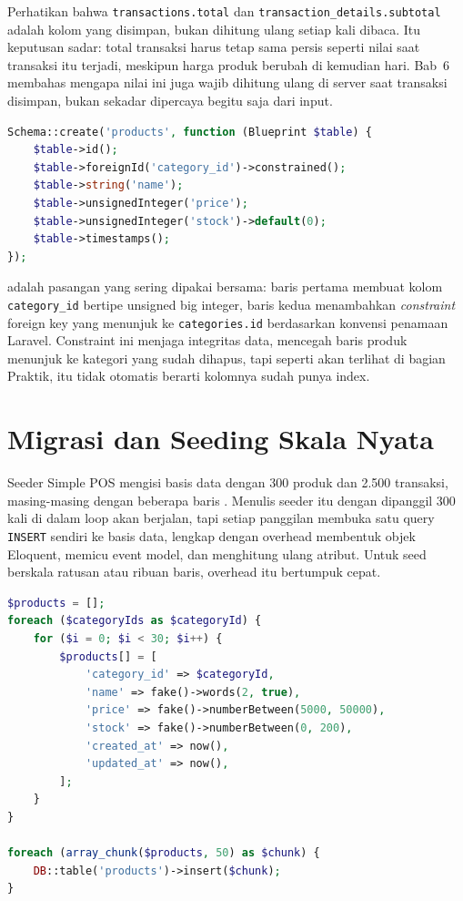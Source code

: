Perhatikan bahwa \texttt{transactions.total} dan
\texttt{transaction\_details.subtotal} adalah kolom yang disimpan, bukan
dihitung ulang setiap kali dibaca. Itu keputusan sadar: total transaksi
harus tetap sama persis seperti nilai saat transaksi itu terjadi, meskipun
harga produk berubah di kemudian hari. Bab~6 membahas mengapa nilai ini
juga wajib dihitung ulang di server saat transaksi disimpan, bukan
sekadar dipercaya begitu saja dari input.

\begin{lstlisting}[language=php, title=\lstfile{database/migrations/2026_08_20_122440_create_products_table.php}]
Schema::create('products', function (Blueprint $table) {
    $table->id();
    $table->foreignId('category_id')->constrained();
    $table->string('name');
    $table->unsignedInteger('price');
    $table->unsignedInteger('stock')->default(0);
    $table->timestamps();
});
\end{lstlisting}

 adalah pasangan yang
sering dipakai bersama: baris pertama membuat kolom
\texttt{category\_id} bertipe unsigned big integer, baris kedua
menambahkan \textit{constraint} foreign key yang menunjuk ke
\texttt{categories.id} berdasarkan konvensi penamaan Laravel. Constraint
ini menjaga integritas data, mencegah baris produk menunjuk ke kategori
yang sudah dihapus, tapi seperti akan terlihat di bagian Praktik, itu
tidak otomatis berarti kolomnya sudah punya index.

\section{Migrasi dan Seeding Skala Nyata}
\label{sec:desain-basis-data-2}

Seeder Simple POS mengisi basis data dengan 300 produk dan 2.500
transaksi, masing-masing dengan beberapa baris .
Menulis seeder itu dengan  dipanggil 300
kali di dalam loop akan berjalan, tapi setiap panggilan
 membuka satu query \texttt{INSERT} sendiri
ke basis data, lengkap dengan overhead membentuk objek Eloquent, memicu
event model, dan menghitung ulang atribut. Untuk seed berskala ratusan
atau ribuan baris, overhead itu bertumpuk cepat.

\begin{lstlisting}[language=php, title=\lstfile{database/seeders/DatabaseSeeder.php}]
$products = [];
foreach ($categoryIds as $categoryId) {
    for ($i = 0; $i < 30; $i++) {
        $products[] = [
            'category_id' => $categoryId,
            'name' => fake()->words(2, true),
            'price' => fake()->numberBetween(5000, 50000),
            'stock' => fake()->numberBetween(0, 200),
            'created_at' => now(),
            'updated_at' => now(),
        ];
    }
}

foreach (array_chunk($products, 50) as $chunk) {
    DB::table('products')->insert($chunk);
}
\end{lstlisting}

